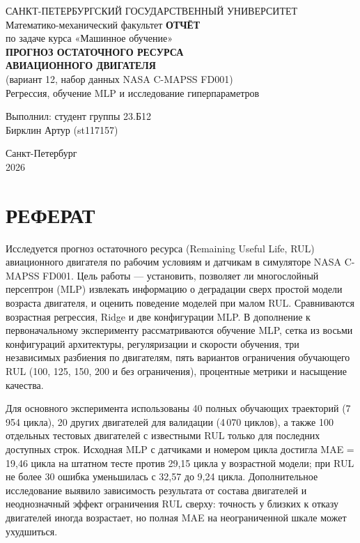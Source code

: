 \documentclass[12pt,a4paper]{article}
\begin{document}
\begin{titlepage}
\begin{center}
{\small САНКТ-ПЕТЕРБУРГСКИЙ ГОСУДАРСТВЕННЫЙ УНИВЕРСИТЕТ\\ Математико-механический факультет}
\vfill
{\bfseries\Large ОТЧЁТ}\\[1em]
по задаче курса «Машинное обучение»\\[1.5em]
{\bfseries\large ПРОГНОЗ ОСТАТОЧНОГО РЕСУРСА\\ АВИАЦИОННОГО ДВИГАТЕЛЯ}\\[0.8em]
(вариант 12, набор данных NASA C-MAPSS FD001)\\[1em]
Регрессия, обучение MLP и исследование гиперпараметров
\end{center}
\vfill
\begin{flushright}
Выполнил: студент группы 23.Б12\\ Бирклин Артур (st117157)
\end{flushright}
\vfill
\begin{center}Санкт-Петербург\\2026\end{center}
\end{titlepage}
\setcounter{page}{2}
\section*{РЕФЕРАТ}
Исследуется прогноз остаточного ресурса (Remaining Useful Life, RUL) авиационного двигателя по рабочим условиям и датчикам в симуляторе NASA C-MAPSS FD001. Цель работы — установить, позволяет ли многослойный персептрон (MLP) извлекать информацию о деградации сверх простой модели возраста двигателя, и оценить поведение моделей при малом RUL. Сравниваются возрастная регрессия, Ridge и две конфигурации MLP. В дополнение к первоначальному эксперименту рассматриваются обучение MLP, сетка из восьми конфигураций архитектуры, регуляризации и скорости обучения, три независимых разбиения по двигателям, пять вариантов ограничения обучающего RUL (100, 125, 150, 200 и без ограничения), процентные метрики и насыщение качества.

Для основного эксперимента использованы 40 полных обучающих траекторий (7\,954 цикла), 20 других двигателей для валидации (4\,070 циклов), а также 100 отдельных тестовых двигателей с известными RUL только для последних доступных строк. Исходная MLP с датчиками и номером цикла достигла MAE = 19,46 цикла на штатном тесте против 29,15 цикла у возрастной модели; при RUL не более 30 ошибка уменьшилась с 32,57 до 9,24 цикла. Дополнительное исследование выявило зависимость результата от состава двигателей и неоднозначный эффект ограничения RUL сверху: точность у близких к отказу двигателей иногда возрастает, но полная MAE на неограниченной шкале может ухудшиться.
\end{document}

